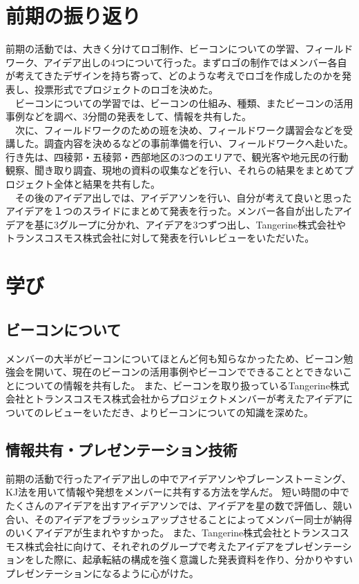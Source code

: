 \documentclass[openany,11pt,papersize]{jsbook}
\begin{document}
\section{前期の振り返り}
前期の活動では、大きく分けてロゴ制作、ビーコンについての学習、フィールドワーク、アイデア出しの4つについて行った。まずロゴの制作ではメンバー各自が考えてきたデザインを持ち寄って、どのような考えでロゴを作成したのかを発表し、投票形式でプロジェクトのロゴを決めた。\\
　ビーコンについての学習では、ビーコンの仕組み、種類、またビーコンの活用事例などを調べ、3分間の発表をして、情報を共有した。\\
　次に、フィールドワークのための班を決め、フィールドワーク講習会などを受講した。調査内容を決めるなどの事前準備を行い、フィールドワークへ赴いた。行き先は、四稜郭・五稜郭・西部地区の3つのエリアで、観光客や地元民の行動観察、聞き取り調査、現地の資料の収集などを行い、それらの結果をまとめてプロジェクト全体と結果を共有した。\\
　その後のアイデア出しでは、アイデアソンを行い、自分が考えて良いと思ったアイデアを１つのスライドにまとめて発表を行った。メンバー各自が出したアイデアを基に3グループに分かれ、アイデアを3つずつ出し、Tangerine株式会社やトランスコスモス株式会社に対して発表を行いレビューをいただいた。

\section{学び}
\subsection{ビーコンについて}
メンバーの大半がビーコンについてほとんど何も知らなかったため、ビーコン勉強会を開いて、現在のビーコンの活用事例やビーコンでできることとできないことについての情報を共有した。
また、ビーコンを取り扱っているTangerine株式会社とトランスコスモス株式会社からプロジェクトメンバーが考えたアイデアについてのレビューをいただき、よりビーコンについての知識を深めた。


\subsection{情報共有・プレゼンテーション技術}
前期の活動で行ったアイデア出しの中でアイデアソンやブレーンストーミング、KJ法を用いて情報や発想をメンバーに共有する方法を学んだ。
短い時間の中でたくさんのアイデアを出すアイデアソンでは、アイデアを星の数で評価し、競い合い、そのアイデアをブラッシュアップさせることによってメンバー同士が納得のいくアイデアが生まれやすかった。
また、Tangerine株式会社とトランスコスモス株式会社に向けて、それぞれのグループで考えたアイデアをプレゼンテーションをした際に、起承転結の構成を強く意識した発表資料を作り、分かりやすいプレゼンテーションになるように心がけた。
\end{document}
